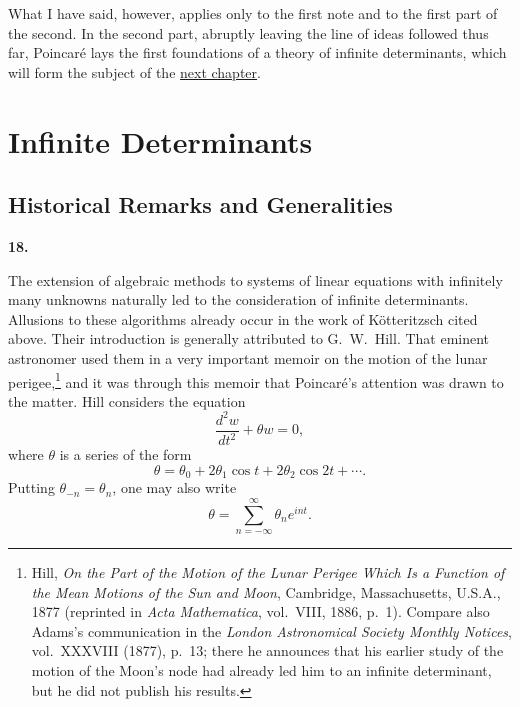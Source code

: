 \documentclass[
  paper=b5,
  fontsize=13pt,
  twoside=true,
  open=any,
  bookmarkpackage=false,
  chapterprefix=true,
  headings=normal
]{scrbook}
\theoremstyle{definition}
\newcommand{\numberedparagraph}[1]{%
  \par\medskip\phantomsection\label{sec:#1}%
  \noindent\textbf{#1.}\enspace
}
\begin{document}

What I have said, however, applies only to the first note and to the first part of the second. In the second part, abruptly leaving the line of ideas followed thus far, Poincar\'e lays the first foundations of a theory of infinite determinants, which will form the subject of the \hyperref[chap:2]{next chapter}.

\chapter{Infinite Determinants}\label{chap:2}

\section{Historical Remarks and Generalities}

\numberedparagraph{18}
The extension of algebraic methods to systems of linear equations with infinitely many unknowns naturally led to the consideration of infinite determinants. Allusions to these algorithms already occur in the work of K\"otteritzsch cited above. Their introduction is generally attributed to G.~W.~Hill. That eminent astronomer used them in a very important memoir on the motion of the lunar perigee,\footnote{Hill, \emph{On the Part of the Motion of the Lunar Perigee Which Is a Function of the Mean Motions of the Sun and Moon}, Cambridge, Massachusetts, U.S.A., 1877 (reprinted in \emph{Acta Mathematica}, vol.~VIII, 1886, p.~1). Compare also Adams's communication in the \emph{London Astronomical Society Monthly Notices}, vol.~XXXVIII (1877), p.~13; there he announces that his earlier study of the motion of the Moon's node had already led him to an infinite determinant, but he did not publish his results.} and it was through this memoir that Poincar\'e's attention was drawn to the matter. Hill considers the equation
\begin{equation}
  \frac{d^2w}{dt^2}+\theta w=0,
  \tag{1}\label{eq:18:1}
\end{equation}
where $\theta$ is a series of the form
\[
  \theta=\theta_0+2\theta_1\cos t+2\theta_2\cos2t+\cdots.
\]
Putting $\theta_{-n}=\theta_n$, one may also write
\begin{equation}
  \theta=\sum_{n=-\infty}^{\infty}\theta_ne^{int}.
  \tag{2}\label{eq:18:2}
\end{equation}
\end{document}
